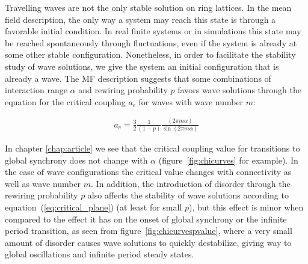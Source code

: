 Travelling waves are not the only stable solution on ring lattices. In the mean field description, the only way a system may reach this
state is through a favorable initial condition. In real finite systems or in simulations this state may be reached spontaneously
through fluctuations, even if the system is already at some other stable configuration. Nonetheless, in order to facilitate the
stability study of wave solutions, we give the system an initial configuration that is already a wave. The MF description suggests that
some combinations of interaction range $\alpha$ and rewiring probability $p$ favors wave solutions through the equation for the
critical coupling $a_c$ for waves with wave number $m$:

\begin{align}
	a_c = \frac{3}{2}\frac{1}{(1-p)}\frac{(2\pi m\alpha)}{\sin(2\pi m\alpha)}
	\label{eq:critical_plane}
\end{align}

In chapter \ref{chap:article} we see that the critical coupling value for transitions to global synchrony does not change with $\alpha$
(figure~\ref{fig:chicurves} for example). In the case of wave configurations the critical value changes with connectivity as well as
wave number $m$. In addition, the introduction of disorder through the rewiring probability $p$ also affects the stability of wave
solutions according to equation~(\ref{eq:critical_plane}) (at least for small $p$), but this effect is minor when compared to the
effect it has on the onset of global synchrony or the infinite period transition, as seen from figure~\ref{fig:chicurvespvalue}, where
a very small amount of disorder causes wave solutions to quickly destabilize, giving way to global oscillations and infinite period
steady states.

